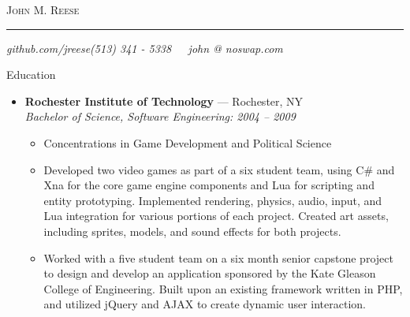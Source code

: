 \documentclass[11pt,oneside]{article}
\makeatletter
\newcommand{\name}{John M. Reese}
\newcommand{\phone}{(513) 341 - 5338}
\newcommand{\email}{john @ noswap.com}
\newcommand{\website}{github.com/jreese}
\newcommand{\bigname}[1]{
    \begin{center}\fontfamily{ppl}\selectfont\Huge\scshape#1\end{center}
}
\newenvironment{ressection}[1]{
    \vspace{8pt}
    {\fontfamily{phv}\selectfont\Large#1}
    \begin{itemize}
    \vspace{3pt}
}{
    \end{itemize}
}
\newcommand{\ressubitem}[1]{
    \vspace{-1pt}
    \item \begin{flushleft} #1 \end{flushleft}
}
\newcommand{\resbigitem}[3]{
    \vspace{-5pt}
    \item
    \textbf{#1} --- #2 \\
    \textit{#3}
}
\newenvironment{ressubsec}[3]{
    \resbigitem{#1}{#2}{#3}
    \vspace{-2pt}
    \begin{itemize}
}{
    \end{itemize}
}
\makeatother
\begin{document}
 \selectfont

\bigname{\name}

\vspace{-8pt} \rule{\textwidth}{1pt}

\vspace{-1pt} {\small\itshape \website \hfill \phone \ \ \ \email}

\vspace{8 pt}




\begin{ressection}{Education}

    \begin{ressubsec}{Rochester Institute of Technology}{Rochester, NY}
    {Bachelor of Science, Software Engineering:  2004 -- 2009}
        \ressubitem{Concentrations in Game Development and Political Science}
        \ressubitem{Developed two video games as part of a six student team, using C\# and Xna for
        the core game engine components and Lua for scripting and entity prototyping.  Implemented
        rendering, physics, audio, input, and Lua integration for various portions of each project.
        Created art assets, including sprites, models, and sound effects for both projects.}
        \ressubitem{Worked with a five student team on a six month senior capstone project
        to design and develop an application sponsored by the Kate Gleason College of Engineering.
        Built upon an existing framework written in PHP, and utilized jQuery and AJAX to create
        dynamic user interaction.}
    \end{ressubsec}

\end{ressection}
\end{document}
